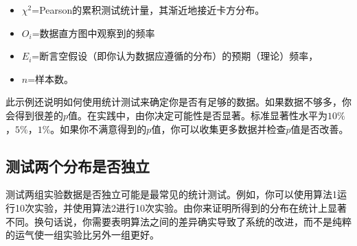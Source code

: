 \begin{itemize}

\item $\chi^2$=Pearson的累积测试统计量，其渐近地接近卡方分布。
\item $O_i$=数据直方图中观察到的频率
\item $E_i$=断言空假设（即你认为数据应遵循的分布）的预期（理论）频率，
\item $n$=样本数。
\end{itemize}


此示例还说明如何使用统计测试来确定你是否有足够的数据。如果数据不够多，你会得到很差的$p$值。在实践中，由你决定可能性是否显著。标准显著性水平为$10\%$，$5\%$，$1\%$。如果你不满意得到的$p$值，你可以收集更多数据并检查$p$值是否改善。


\subsection{测试两个分布是否独立}
测试两组实验数据是否独立可能是最常见的统计测试。例如，你可以使用算法1运行10次实验，并使用算法2进行10次实验。由你来证明所得到的分布在统计上显著不同。换句话说，你需要表明算法之间的差异确实导致了系统的改进，而不是纯粹的运气使一组实验比另外一组更好。

